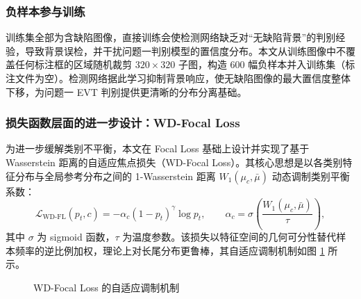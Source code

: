 \subsubsection{负样本参与训练}

训练集全部为含缺陷图像，直接训练会使检测网络缺乏对“无缺陷背景”的判别经验，导致背景误检，并干扰问题一判别模型的置信度分布。本文从训练图像中不覆盖任何标注框的区域随机裁剪 $320\times320$ 子图，构造 600 幅负样本并入训练集（标注文件为空）。检测网络据此学习抑制背景响应，使无缺陷图像的最大置信度整体下移，为问题一 EVT 判别提供更清晰的分布分离基础。

\subsubsection{损失函数层面的进一步设计：WD-Focal Loss}

为进一步缓解类别不平衡，本文在 Focal Loss\cite{lin2017focal} 基础上设计并实现了基于 Wasserstein 距离的自适应焦点损失（WD-Focal Loss）。其核心思想是以各类别特征分布与全局参考分布之间的 1-Wasserstein 距离 $W_1(\mu_c,\bar{\mu})$ 动态调制类别平衡系数\cite{villani2009}：
\begin{equation}
  \mathcal{L}_{\mathrm{WD\text{-}FL}}(p_t,c) = -\alpha_c (1-p_t)^{\gamma}\log p_t,
  \qquad \alpha_c = \sigma\!\left(\frac{W_1(\mu_c,\bar{\mu})}{\tau}\right),
  \label{eq:wd_focal}
\end{equation}
其中 $\sigma$ 为 sigmoid 函数，$\tau$ 为温度参数。该损失以特征空间的几何可分性替代样本频率的逆比例加权，理论上对长尾分布更鲁棒，其自适应调制机制如图 \ref{fig:wd_focal} 所示。

\begin{figure}[H]
\centering
{}
\caption{WD-Focal Loss 的自适应调制机制}\label{fig:wd_focal}
\end{figure}

